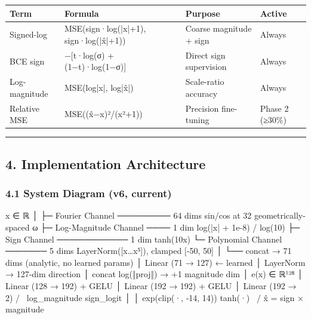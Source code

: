 \documentclass[11pt]{article}
\begin{document}
\begin{longtable}{|>{\raggedright\arraybackslash}p{}|>{\raggedright\arraybackslash}p{}|>{\raggedright\arraybackslash}p{}|>{\raggedright\arraybackslash}p{}|}
\hline
\textbf{Term} & \textbf{Formula} & \textbf{Purpose} & \textbf{Active} \\ \hline
Signed-log & MSE(sign·log(|x|+1), sign·log(|x̂|+1)) & Coarse magnitude + sign & Always \\ \hline
BCE sign & −[t·log(σ) + (1−t)·log(1−σ)] & Direct sign supervision & Always \\ \hline
Log-magnitude & MSE(log|x|, log|x̂|) & Scale-ratio accuracy & Always \\ \hline
Relative MSE & MSE((x̂−x)²/(x²+1)) & Precision fine-tuning & Phase 2 (≥30\%) \\ \hline
\end{longtable}


\noindent\rule{\textwidth}{0.4pt}


\subsection*{4. Implementation Architecture}


\subsubsection*{4.1 System Diagram (v6, current)}


\begin{CodeBlock}
x ∈ ℝ
│
├─ Fourier Channel ───────── 64 dims   sin/cos at 32 geometrically-spaced ω
├─ Log-Magnitude Channel ──── 1 dim    log(|x| + 1e-8) / log(10)
├─ Sign Channel ──────────── 1 dim    tanh(10x)
└─ Polynomial Channel ─────── 5 dims   LayerNorm([x…x⁵]), clamped [-50, 50]
              │
              └── concat → 71 dims (analytic, no learned params)
                        │
                  Linear (71 → 127)    ← learned
                        │
                  LayerNorm → 127-dim direction
                        │
                  concat log(‖proj‖) → +1 magnitude dim
                        │
                   e(x) ∈ ℝ¹²⁸
                        │
                  Linear (128 → 192) + GELU
                        │
                  Linear (192 → 192) + GELU
                        │
                  Linear (192 → 2)
                  /              \
           log_magnitude      sign_logit
                 │                  │
      exp(clip(·, -14, 14))      tanh(·)
                  \               /
                   x̂ = sign × magnitude
\end{CodeBlock}
\end{document}
